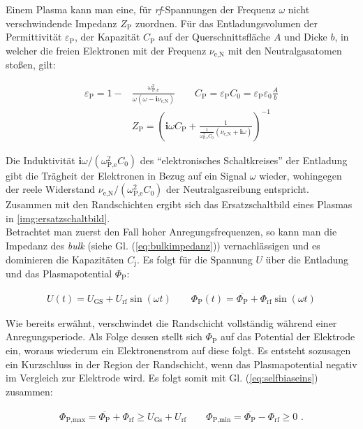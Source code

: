 \documentclass[numbers=noenddot,a4paper]{scrartcl}
\newcommand{\ix}[1]{_\text{#1}}
\newcommand{\imag}{\mathbf{i}}
\newcommand{\tilt}[1]{\textit{#1}}
\begin{document}
					Einem Plasma kann man eine, für \tilt{rf}-Spannungen der Frequenz $\omega$ nicht verschwindende Impedanz $Z\ix{P}$ zuordnen. Für das Entladungsvolumen der Permittivität $\varepsilon\ix{P}$, der Kapazität $C\ix{P}$ auf der Querschnittsfläche $A$ und Dicke $b$, in welcher die freien Elektronen mit der Frequenz $\nu\ix{e,N}$ mit den Neutralgasatomen stoßen, gilt:

					\begin{align}
					\varepsilon\ix{P}=1-&\frac{\omega\ix{P,e}^2}{\omega\left(\omega-\imag\nu\ix{e,N}\right)} \quad \quad C\ix{P}=\varepsilon\ix{P}C\ix{0}=\varepsilon\ix{P}\varepsilon\ix{0}\frac{A}{b} \\
					&Z\ix{P}=\left(\imag\omega C\ix{P}+ \frac{1}{\frac{1}{\omega\ix{P,e}^2C\ix{0}}\left(\nu\ix{e,N}+\imag\omega\right)}\right)^{-1}
					\label{eq:bulkimpedanz}
					\end{align}

					Die Induktivität $\imag\omega/\left(\omega\ix{P,e}^2C\ix{0}\right)$ des "`elektronisches Schaltkreises"' der Entladung gibt die Trägheit der Elektronen in Bezug auf ein Signal $\omega$ wieder, wohingegen der reele Widerstand $\nu\ix{e,N}/\left(\omega\ix{P,e}^2C\ix{0}\right)$ der Neutralgasreibung entspricht. Zusammen mit den Randschichten ergibt sich das Ersatzschaltbild eines Plasmas in \ref{img:ersatzschaltbild}.\\
					Betrachtet man zuerst den Fall hoher Anregungsfrequenzen, so kann man die Impedanz des \tilt{bulk} (siehe Gl. (\ref{eq:bulkimpedanz})) vernachlässigen und es dominieren die Kapazitäten $C\ix{j}$. Es folgt für die Spannung $U$ über die Entladung und das Plasmapotential $\Phi\ix{P}$:

						\begin{align}
							U\left(t\right)=U\ix{GS}+U\ix{rf}\sin\left(\omega t\right) \quad \quad \Phi\ix{P}\left(t\right)=\overline{\Phi\ix{P}}+\Phi\ix{rf}\sin\left(\omega t\right) \label{eq:selfbiaseins}
						\end{align}

					Wie bereits erwähnt, verschwindet die Randschicht vollständig während einer Anregungsperiode. Als Folge dessen stellt sich $\Phi\ix{P}$ auf das Potential der Elektrode ein, woraus wiederum ein Elektronenstrom auf diese folgt. Es entsteht sozusagen ein Kurzschluss in der Region der Randschicht, wenn das Plasmapotential negativ im Vergleich zur Elektrode wird. Es folgt somit mit Gl. (\ref{eq:selfbiaseins}) zusammen:

						\begin{align}
							\Phi\ix{P,max}=\overline{\Phi\ix{P}}+\Phi\ix{rf}\geq U\ix{Gs}+U\ix{rf} \quad \quad \Phi\ix{P,min}=\overline{\Phi\ix{P}}-\Phi\ix{rf}\geq 0\, \, . \label{eq:ungleichungen}
						\end{align}
\end{document}
